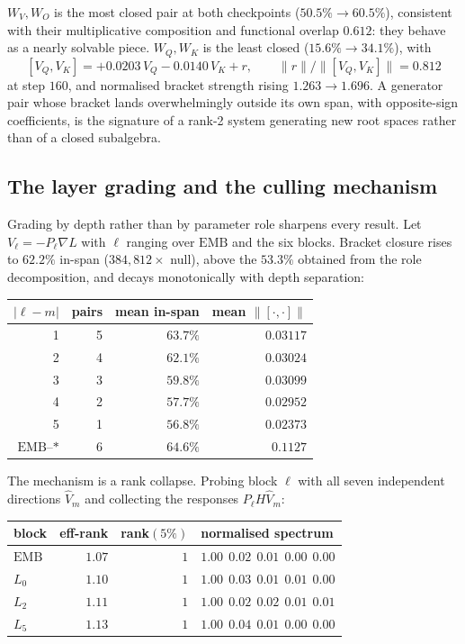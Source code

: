 \begin{observation}
$W_V,W_O$ is the most closed pair at both checkpoints ($50.5\% \to 60.5\%$),
consistent with their multiplicative composition and functional overlap
$0.612$: they behave as a nearly solvable piece. $W_Q,W_K$ is the least closed
($15.6\% \to 34.1\%$), with
\[
  [V_Q,V_K] = +0.0203\,V_Q - 0.0140\,V_K + r,
  \qquad \|r\|/\|[V_Q,V_K]\| = 0.812
\]
at step $160$, and normalised bracket strength rising $1.263 \to 1.696$. A
generator pair whose bracket lands overwhelmingly outside its own span, with
opposite-sign coefficients, is the signature of a rank-2 system generating new
root spaces rather than of a closed subalgebra.
\end{observation}

\subsection{The layer grading and the culling mechanism}

Grading by depth rather than by parameter role sharpens every result. Let
$V_\ell = -P_\ell\nabla L$ with $\ell$ ranging over $\mathrm{EMB}$ and the six
blocks. Bracket closure rises to $62.2\%$ in-span ($384{,}812\times$ null),
above the $53.3\%$ obtained from the role decomposition, and decays
monotonically with depth separation:

\begin{center}
\begin{tabular}{rrrr}
\toprule
$|\ell-m|$ & pairs & mean in-span & mean $\|[\cdot,\cdot]\|$ \\
\midrule
1 & 5 & $63.7\%$ & $0.03117$ \\
2 & 4 & $62.1\%$ & $0.03024$ \\
3 & 3 & $59.8\%$ & $0.03099$ \\
4 & 2 & $57.7\%$ & $0.02952$ \\
5 & 1 & $56.8\%$ & $0.02373$ \\
\midrule
$\mathrm{EMB}$--$*$ & 6 & $64.6\%$ & $0.1127$ \\
\bottomrule
\end{tabular}
\end{center}

The mechanism is a rank collapse. Probing block $\ell$ with all seven
independent directions $\widehat V_m$ and collecting the responses
$P_\ell H\widehat V_m$:

\begin{center}
\begin{tabular}{lrrl}
\toprule
block & eff-rank & rank$(5\%)$ & normalised spectrum \\
\midrule
$\mathrm{EMB}$ & $1.07$ & $1$ & $1.00\ \ 0.02\ \ 0.01\ \ 0.00\ \ 0.00$ \\
$L_0$ & $1.10$ & $1$ & $1.00\ \ 0.03\ \ 0.01\ \ 0.01\ \ 0.00$ \\
$L_2$ & $1.11$ & $1$ & $1.00\ \ 0.02\ \ 0.02\ \ 0.01\ \ 0.01$ \\
$L_5$ & $1.13$ & $1$ & $1.00\ \ 0.04\ \ 0.01\ \ 0.00\ \ 0.00$ \\
\bottomrule
\end{tabular}
\end{center}

